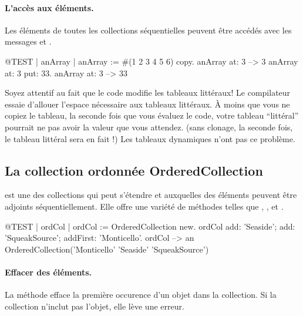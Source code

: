 \documentclass[a4paper,10pt,twoside]{book}
\begin{document}
\paragraph{L'acc\`es aux \'el\'ements.}
Les \'el\'ements de toutes les collections s\'equentielles peuvent
\^etre acc\'ed\'es avec les messages  et
 .

\begin{code}{@TEST | anArray |}
anArray := #(1 2 3 4 5 6) copy.
anArray at: 3 --> 3
anArray at: 3 put: 33.
anArray at: 3 --> 33
\end{code}

\noindent
Soyez attentif au fait que le code modifie les tableaux litt\'eraux!
Le compilateur essaie d'allouer l'espace n\'ecessaire aux tableaux litt\'eraux.
\`A moins que vous ne copiez le tableau, la seconde fois que vous \'evaluez
le code, votre tableau ``litt\'eral'' pourrait ne pas avoir la valeur que vous
attendez.
(sans clonage, la seconde fois, le tableau litt\'eral  sera en fait !)
Les tableaux dynamiques n'ont pas ce probl\`eme.

\subsection{La collection ordonn\'ee OrderedCollection}
 est une des collections qui peut s'\'etendre
et auxquelles des \'el\'ements peuvent \^etre adjoints s\'equentiellement.
Elle offre une vari\'et\'e de m\'ethodes telles que , ,  et .

\begin{code}{@TEST | ordCol |}
ordCol := OrderedCollection new.
ordCol add: 'Seaside'; add: 'SqueakSource'; addFirst: 'Monticello'.
ordCol --> an OrderedCollection('Monticello' 'Seaside' 'SqueakSource')
\end{code}

\paragraph{Effacer des \'el\'ements.} La m\'ethode   efface la premi\`ere occurence d'un objet dans la collection. Si la collection n'inclut pas l'objet, elle l\`eve une erreur.
\end{document}
